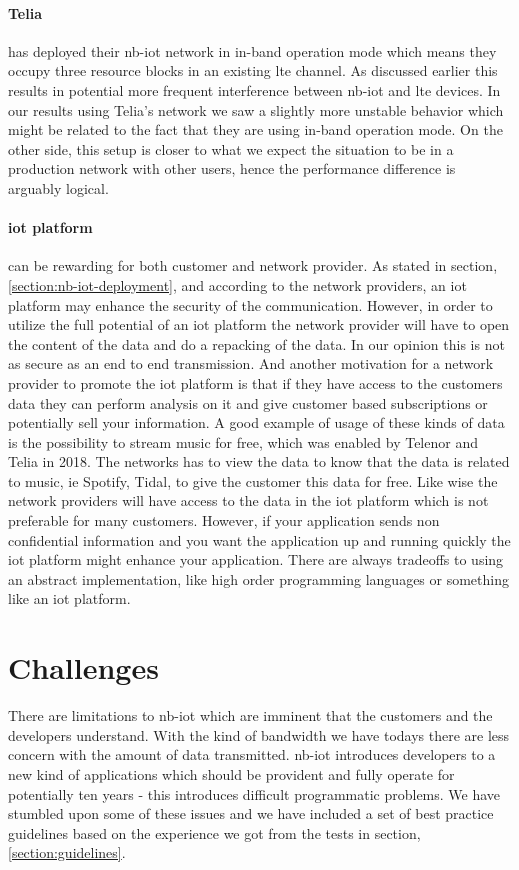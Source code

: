 \documentclass[USenglish]{ifimaster}  %
\begin{document}
\paragraph{Telia} has deployed their \acrshort{nb-iot} network in in-band operation mode which means they occupy three resource blocks in an existing \acrshort{lte} channel. As discussed earlier this results in potential more frequent interference between \acrshort{nb-iot} and \acrshort{lte} devices. In our results using Telia's network we saw a slightly more unstable behavior which might be related to the fact that they are using in-band operation mode. On the other side, this setup is closer to what we expect the situation to be in a production network with other users, hence the performance difference is arguably logical.

\paragraph{\acrshort{iot} platform} can be rewarding for both customer and network provider. As stated in section, \vref{section:nb-iot-deployment}, and according to the network providers, an \acrshort{iot} platform may enhance the security of the communication. However, in order to utilize the full potential of an \acrshort{iot} platform the network provider will have to open the content of the data and do a repacking of the data. In our opinion this is not as secure as an end to end transmission. And another motivation for a network provider to promote the \acrshort{iot} platform is that if they have access to the customers data they can perform analysis on it and give customer based subscriptions or potentially sell your information. A good example of usage of these kinds of data is the possibility to stream music for free, which was enabled by Telenor and Telia in 2018. The networks has to view the data to know that the data is related to music, ie Spotify, Tidal, to give the customer this data for free. Like wise the network providers will have access to the data in the \acrshort{iot} platform which is not preferable for many customers. However, if your application sends non confidential information and you want the application up and running quickly the \acrshort{iot} platform might enhance your application. There are always tradeoffs to using an abstract implementation, like high order programming languages or something like an \acrshort{iot} platform.

\section{Challenges} \label{section:challenges}
There are limitations to \acrshort{nb-iot} which are imminent that the customers and the developers understand. With the kind of bandwidth we have todays there are less concern with the amount of data transmitted. \acrshort{nb-iot} introduces developers to a new kind of applications which should be provident and fully operate for potentially ten years - this introduces difficult programmatic problems. We have stumbled upon some of these issues and we have included a set of best practice guidelines based on the experience we got from the tests in section, \vref{section:guidelines}.
\end{document}
